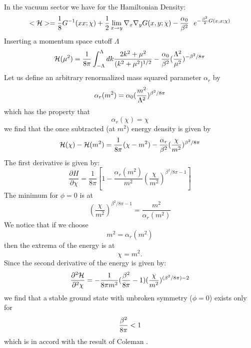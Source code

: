 \documentclass[a4paper,prd,preprint,superscriptaddress,showpacs,byrevtex]{revtex4}
\begin{document}
In the vacuum sector we have  for the Hamiltonian Density:
\begin{equation}
< {\cal{H}} > = {1 \over 8} G^{-1}(xx;\chi) + {1 \over 2}
\lim_{x \rightarrow y}  \nabla_x \nabla_y G(x,y;\chi)
 - {\alpha_0 \over \beta^2}~~ e^{- {\beta^2 \over 2} G(x,x;\chi)}
\end{equation}
Inserting a momentum space cutoff $\Lambda$
\begin{equation}
{\cal{H}}(\mu^2) = {1 \over 8 \pi} \int_{-\Lambda}^{\Lambda} dk
{2 k^2 + \mu^2 \over (k^2 + \mu^2)^{1/2} } - {\alpha_0 \over \beta^2}
 ( {\Lambda^2
\over \mu^2})^ {-\beta^2/ 8 \pi}
\end{equation}
Let us define an arbitrary  renormalized mass squared parameter $\alpha_r$
by
\begin{equation}
\alpha_r(m^2) = \alpha_0 ({m^2 \over \Lambda^2})^{\beta^2/ 8 \pi}
\end{equation}
which has the property that
\begin{equation}
\alpha_r(\chi) = \chi
\end{equation}
we find that the once subtracted (at $m^2$) energy density is given by
\begin{equation}
{\cal{H}}(\chi)-{\cal{H}}(m^2)= {1 \over 8 \pi} (\chi - m^2)
- {\alpha_r \over \beta^2} ({\chi \over m^2})^{\beta^2 / 8 \pi}
\end{equation}
The first derivative is given by:
\begin{equation}
\frac{\partial H}{\partial \chi} = \frac{1}{8 \pi} [1-
\frac{\alpha_r(m^2)}{m^2}
(\frac{\chi}{m^2})^{\beta^2/8 \pi -1}]
\end{equation}
The minimum for $\phi=0$ is at
\begin{equation}
(\frac{\chi}{m^2})^{\beta^2/8 \pi -1}= \frac{m^2}{\alpha_r(m^2)}
\end{equation}
We notice that if we choose
\[   m^2 = \alpha_r (m^2)\]
then the extrema of the energy is at
\[  \chi = m^2. \]
Since the second derivative of the energy is given by:
\begin{equation}
{\partial^2 {\cal{H}} \over \partial^2\chi} = -{1 \over 8 \pi m^2}
({\beta^2 \over 8 \pi}-1) ({\chi \over m^2})^{(\beta^2/ 8 \pi)-2}
\end{equation}
we find that a stable ground state with unbroken symmetry ($\phi=0$) exists
only for
\begin{equation}
{\beta^2 \over 8 \pi} < 1
\end{equation}
which is in accord with the result of Coleman \cite{ref:Coleman}.
\end{document}
